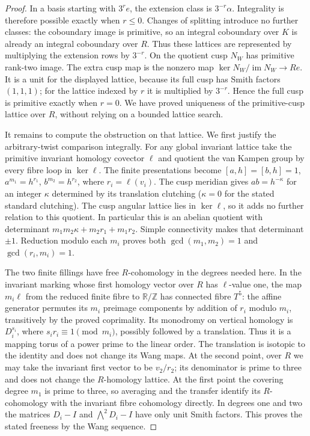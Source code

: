 \begin{proof}
In a basis starting with $3^re$, the extension class is
$3^{-r}\alpha$.  Integrality is therefore possible exactly
when $r\leq0$.  Changes of splitting introduce no further
classes: the coboundary image is primitive, so an integral
coboundary over $K$ is already an integral coboundary over
$R$.  Thus these lattices are represented by multiplying
the extension rows by $3^{-r}$.
On the quotient cusp $N_W$ has primitive rank-two image.
The extra cusp map is the nonzero map
$\ker N_W/\operatorname{im}N_W\to Re$.
It is a unit for the displayed lattice, because its full
cusp has Smith factors $(1,1,1)$; for the lattice indexed
by $r$ it is multiplied by $3^{-r}$.
Hence the full cusp is primitive exactly when $r=0$.
We have proved uniqueness of the primitive-cusp lattice
over $R$, without relying on a bounded lattice search.

It remains to compute the obstruction on that lattice.
We first justify the arbitrary-twist comparison integrally.
For any global invariant lattice take the primitive invariant
homology covector $\ell$ and quotient the van Kampen group
by every fibre loop in $\ker\ell$.
The finite presentations become
$[a,h]=[b,h]=1$, $a^{m_1}=h^{r_1}$,
$b^{m_2}=h^{r_2}$, where $r_i=\ell(v_i)$.
The cusp meridian gives $ab=h^{-\kappa}$ for an integer
$\kappa$ determined by its translation clutching
($\kappa=0$ for the stated standard clutching).
The cusp angular lattice lies in $\ker\ell$, so it adds
no further relation to this quotient.  In particular this
is an abelian quotient with determinant
$m_1m_2\kappa+m_2r_1+m_1r_2$.
Simple connectivity makes that determinant $\pm1$.
Reduction modulo each $m_i$ proves both
$\gcd(m_1,m_2)=1$ and $\gcd(r_i,m_i)=1$.

The two finite fillings have free $R$-cohomology in the
degrees needed here.  In the invariant marking whose first
homology vector over $R$ has $\ell$-value one, the map
$m_i\ell$ from the reduced finite fibre to $\mathbb R/\mathbb Z$
has connected fibre $T^5$: the affine generator permutes
its $m_i$ preimage components by addition of $r_i$ modulo
$m_i$, transitively by the proved coprimality.
Its monodromy on vertical homology is $D_i^{s_i}$, where
$s_ir_i\equiv1\pmod {m_i}$, possibly followed by a translation.
Thus it is a mapping torus of a power prime to the linear
order.  The translation is isotopic to the identity and
does not change its Wang maps.  At the second point, over
$R$ we may take the invariant first vector to be $v_2/r_2$;
its denominator is prime to three and does not change the
$R$-homology lattice.  At the first point the covering
degree $m_1$ is prime to three, so averaging and the transfer
identify its $R$-cohomology with the invariant fibre
cohomology directly.
In degrees one and two the matrices
$D_i-I$ and $\bigwedge^2D_i-I$ have only unit Smith factors.
This proves the stated freeness by the Wang sequence.


\end{proof}

